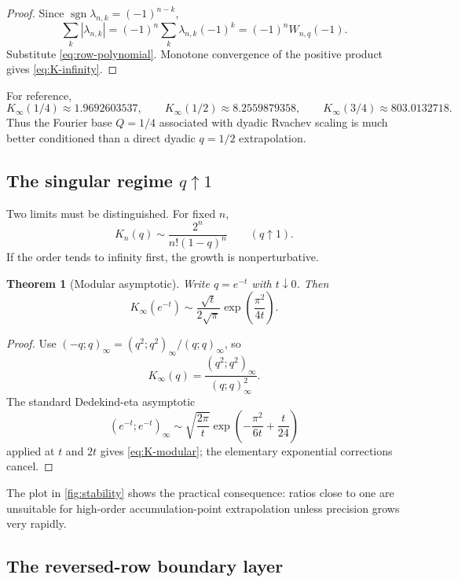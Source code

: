 \documentclass[11pt,oneside]{article}
\numberwithin{equation}{section}
\newtheorem{theorem}{Theorem}[section]
\theoremstyle{definition}
\theoremstyle{remark}
\begin{document}
\begin{proof}
Since
$\operatorname{sgn}\lambda_{n,k}=(-1)^{n-k}$,
\[
 \sum_k|\lambda_{n,k}|=(-1)^n\sum_k\lambda_{n,k}(-1)^k
 =(-1)^nW_{n,q}(-1).
\]
Substitute \eqref{eq:row-polynomial}.  Monotone convergence of the positive
product gives \eqref{eq:K-infinity}.
\end{proof}

For reference,
\[
 K_\infty(1/4)\approx1.9692603537,
 \qquad K_\infty(1/2)\approx8.2559879358,
 \qquad K_\infty(3/4)\approx803.0132718.
\]
Thus the Fourier base $Q=1/4$ associated with dyadic Rvachev scaling is much
better conditioned than a direct dyadic $q=1/2$ extrapolation.

\subsection{The singular regime $q\uparrow1$}

Two limits must be distinguished.  For fixed $n$,
\begin{equation}
 K_n(q)\sim\frac{2^n}{n!(1-q)^n}
 \qquad(q\uparrow1).
 \label{eq:fixed-n-q1}
\end{equation}
If the order tends to infinity first, the growth is nonperturbative.

\begin{theorem}[Modular asymptotic]
Write $q=e^{-t}$ with $t\downarrow0$.  Then
\begin{equation}
 K_\infty(e^{-t})
 \sim\frac{\sqrt t}{2\sqrt\pi}
 \exp\!\left(\frac{\pi^2}{4t}\right).
 \label{eq:K-modular}
\end{equation}
\end{theorem}

\begin{proof}
Use
$(-q;q)_\infty=(q^2;q^2)_\infty/(q;q)_\infty$, so
\[
 K_\infty(q)=\frac{(q^2;q^2)_\infty}{(q;q)_\infty^2}.
\]
The standard Dedekind-eta asymptotic
\[
 (e^{-t};e^{-t})_\infty
 \sim\sqrt{\frac{2\pi}{t}}
 \exp\!\left(-\frac{\pi^2}{6t}+\frac{t}{24}\right)
\]
applied at $t$ and $2t$ gives \eqref{eq:K-modular}; the elementary exponential
corrections cancel.
\end{proof}

The plot in \cref{fig:stability} shows the practical consequence: ratios close
to one are unsuitable for high-order accumulation-point extrapolation unless
precision grows very rapidly.

\subsection{The reversed-row boundary layer}
\end{document}
